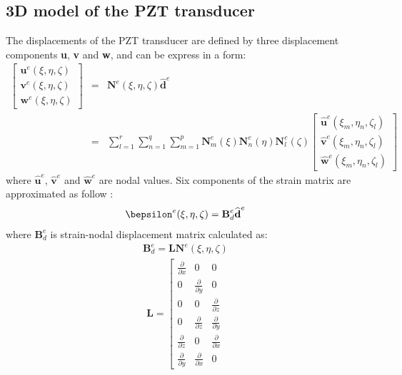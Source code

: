\documentclass[a4paper,12pt]{article}
\begin{document}
{\subsection{3D model of the PZT transducer}
\label{sec:3D_SEM}
The displacements of the PZT transducer are defined by three displacement components \textbf{u}, \textbf{v} and \textbf{w}, and can be express in a form:
\begin{eqnarray}
\left [ \begin{array}{c}
\textbf{u}^e(\xi,\eta,\zeta) \\
\textbf{v}^e(\xi,\eta,\zeta) \\
\textbf{w}^e(\xi,\eta,\zeta)
\end{array} \right]
& = & \textbf{N}^e(\xi,\eta, \zeta)\widehat{\textbf{d}}^e\nonumber\\
& = & \sum_{l=1}^r\sum_{n=1}^q\sum_{m=1}^p\textbf{N}_m^e(\xi)\textbf{N}_n^e(\eta)\textbf{N}_l^e(\zeta)
\left [ \begin{array}{c}
\widehat{\textbf{u}}^e(\xi_m,\eta_n,\zeta_l) \\
\widehat{\textbf{v}}^e(\xi_m,\eta_n,\zeta_l) \\
\widehat{\textbf{w}}^e(\xi_m,\eta_n,\zeta_l)
\end{array} \right]
\label{eq:3D_displ}
\end{eqnarray}
where \(\widehat{\textbf{u}}^e\), \(\widehat{\textbf{v}}^e\) and 
\(\widehat{\textbf{w}}^e\) are nodal values.
Six components of the strain matrix are approximated as follow 
\cite{kudela20093d}:
\begin{eqnarray}
\bepsilon^e(\xi,\eta,\zeta)=\textbf{B}_{d}^e\widehat{\textbf{d}}^e
\end{eqnarray}
where \(\textbf{B}_{d}^e\) is strain-nodal displacement matrix calculated as:
\begin{eqnarray}
\textbf{B}_{d}^e=\textbf{L}\textbf{N}^e(\xi,\eta,\zeta)
\end{eqnarray}
\begin{eqnarray}
\textbf{L}=\left [
\begin{array}{ccc}
\frac{\partial }{\partial x} & 0 & 0\\
0 & \frac{\partial }{\partial y} & 0\\
0 & 0 & \frac{\partial }{\partial z}\\
0 & \frac{\partial }{\partial z} & \frac{\partial }{\partial y}\\
\frac{\partial }{\partial z} & 0 & \frac{\partial }{\partial x}\\
\frac{\partial }{\partial y} & \frac{\partial }{\partial x} & 0

\end{array}
\end{eqnarray}}
\end{document}
